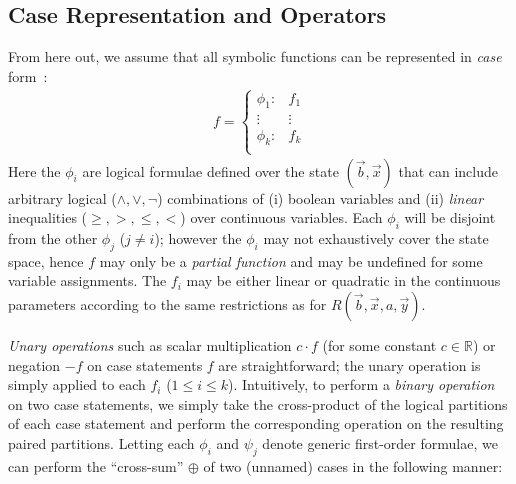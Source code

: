 \subsection{Case Representation and Operators}

From here out, we assume that all symbolic functions
can be represented in \emph{case} form~\cite{fomdp}:
{%
\begin{align}
f = 
\begin{cases}
  \phi_1: & f_1 \\ 
 \vdots&\vdots\\ 
  \phi_k: & f_k \\ 
\end{cases} \label{eq:case}
\end{align}
}
Here the $\phi_i$ are logical formulae defined over the state
$(\vec{b},\vec{x})$ that can include arbitrary logical ($\land,\lor,\neg$)
combinations of (i) boolean variables and (ii) 
\emph{linear} inequalities ($\geq,>,\leq,<$) 
over continuous variables.  
Each $\phi_i$ will be disjoint from the other $\phi_j$ ($j \neq i$); 
however the $\phi_i$ may not exhaustively cover the state space, hence
$f$ may only be a \emph{partial function} and may be undefined for some
variable assignments.
The $f_i$ may be either linear or quadratic in the continuous parameters
according to the same restrictions as for 
$R(\vec{b},\vec{x},a,\vec{y})$.

\emph{Unary operations} such as scalar multiplication $c\cdot f$ (for
some constant $c \in \mathbb{R}$) or negation $-f$ on case statements
$f$ are straightforward; the unary operation is simply applied to each
$f_i$ ($1 \leq i \leq k$). Intuitively, to perform a \emph{binary
  operation} on two case statements, we simply take the cross-product
of the logical partitions of each case statement and perform the
corresponding operation on the resulting paired partitions.  Letting
each $\phi_i$ and $\psi_j$ denote generic first-order formulae, we can
perform the ``cross-sum'' $\oplus$ of two (unnamed) cases in the
following manner:


